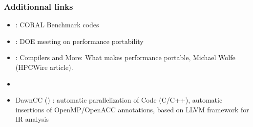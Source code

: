 \begin{frame}
  \frametitle{Additionnal links}

  \begin{itemize}
  \item {} : CORAL Benchmark codes
  \item {} : DOE meeting on performance portability
  \item {\small {}} : Compilers and More: What makes performance portable, Michael Wolfe (HPCWire article).
  \item {\small {}}
  \item DawnCC () : automatic parallelization of Code (C/C++), automatic insertions of OpenMP/OpenACC annotations, based on LLVM framework for IR analysis
  \end{itemize}

\end{frame}
